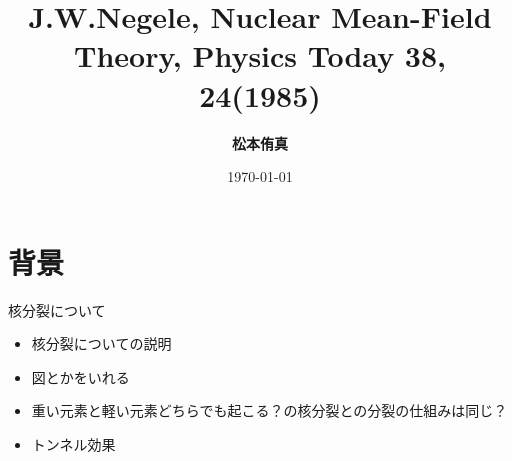 \documentclass[14pt,aspectratio=169,xcolor=dvipsnames,table,dvipdfmx]{beamer}
\title{J.W.Negele, Nuclear Mean-Field Theory, Physics Today 38, 24(1985)}
\author{\textbf{松本侑真}}
\date{\today}
\institute{}
\theoremstyle{definition}
\begin{document}
\maketitle
\frame{\tableofcontents[hideallsubsections]}

\section{背景}
\begin{frame}{核分裂について}
  \begin{itemize}
    \item 核分裂についての説明
    \item 図とかをいれる
    \item 重い元素と軽い元素どちらでも起こる？の核分裂との分裂の仕組みは同じ？
    \item トンネル効果
  \end{itemize}
\end{frame}
\end{document}
